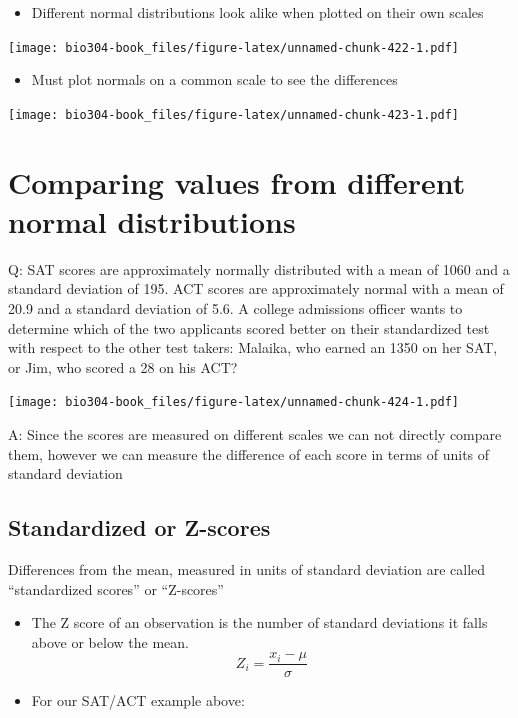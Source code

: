 \documentclass[]{book}
\providecommand{\tightlist}{%
  \setlength{\itemsep}{0pt}\setlength{\parskip}{0pt}}
\theoremstyle{definition}
\theoremstyle{definition}
\theoremstyle{definition}
\theoremstyle{remark}
\begin{document}
\begin{itemize}
\tightlist
\item
  Different normal distributions look alike when plotted on their own
  scales
\end{itemize}

\texttt{[image: bio304-book\_files/figure-latex/unnamed-chunk-422-1.pdf]}

\begin{itemize}
\tightlist
\item
  Must plot normals on a common scale to see the differences
\end{itemize}

\texttt{[image: bio304-book\_files/figure-latex/unnamed-chunk-423-1.pdf]}

\hypertarget{comparing-values-from-different-normal-distributions}{%
\section{Comparing values from different normal
distributions}\label{comparing-values-from-different-normal-distributions}}

Q: SAT scores are approximately normally distributed with a mean of 1060
and a standard deviation of 195. ACT scores are approximately normal
with a mean of 20.9 and a standard deviation of 5.6. A college
admissions officer wants to determine which of the two applicants scored
better on their standardized test with respect to the other test takers:
Malaika, who earned an 1350 on her SAT, or Jim, who scored a 28 on his
ACT?

\texttt{[image: bio304-book\_files/figure-latex/unnamed-chunk-424-1.pdf]}

A: Since the scores are measured on different scales we can not directly
compare them, however we can measure the difference of each score in
terms of units of standard deviation

\hypertarget{standardized-or-z-scores}{%
\subsection{Standardized or Z-scores}\label{standardized-or-z-scores}}

Differences from the mean, measured in units of standard deviation are
called ``standardized scores'' or ``Z-scores''

\begin{itemize}
\item
  The Z score of an observation is the number of standard deviations it
  falls above or below the mean. \[
  Z_i = \frac{x_i - \mu}{\sigma}
  \]
\item
  For our SAT/ACT example above:
\end{itemize}
\end{document}
